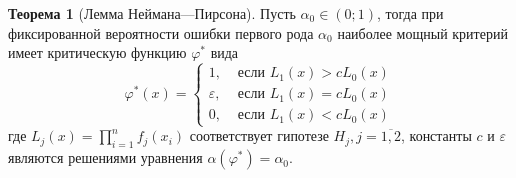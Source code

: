 \documentclass[oneside,final,14pt]{extreport}
\theoremstyle{plain}
\theoremstyle{definition}
\theoremstyle{named}
\newtheorem*{namedthm}{Теорема}
\begin{document}
\begin{namedthm}[Лемма Неймана---Пирсона]
Пусть $\alpha_{0} \in(0;1)$, тогда при фиксированной вероятности ошибки первого рода $\alpha_{0}$ наиболее мощный критерий имеет критическую функцию $\varphi^{*}$ вида
\begin{equation*}
    \varphi^{*}(x)=\left\{\begin{array}{ll}
    1, & \text { если } L_{1}(x)>c L_{0}(x) \\
    \varepsilon, & \text { если } L_{1}(x)=c L_{0}(x) \\
    0, & \text { если } L_{1}(x)<c L_{0}(x)
    \end{array}\right.
\end{equation*}
где $L_{j}(x)=\prod_{i=1}^{n} f_{j}\left(x_{i}\right)$ соответствует гипотезе $H_j, j = \overline{1,2}$, константы $c$ и $\varepsilon$ являются решениями уравнения $\alpha\left(\varphi^{*}\right)=\alpha_{0}$.
\end{namedthm}
\end{document}
